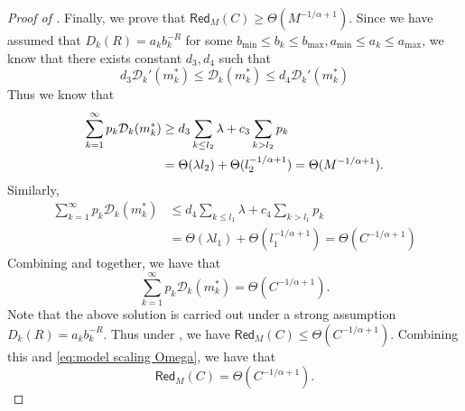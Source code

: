 \documentclass[11pt]{article}
\theoremstyle{plain}
\theoremstyle{definition}
\newtheorem{assumption}[theorem]{Assumption}
\newcommand{\ratedistortion}{\mathcal{D}}
\newcommand{\ferror}{\mathsf{Red}}
\newcommand{\testmodelerror}{\mathsf{Red}_M}
\newcommand{\jian}[1]{{\it \color{red}{Jian: #1}}}
\begin{document}
\begin{proof}[Proof of ]
Finally, we prove that $\testmodelerror(C)\ge \Theta(M^{-1/\alpha+1})$. 
Since we have assumed that $D_k(R)=a_kb_k^{-R}$ for some $b_{\min}\le b_k\le b_{\max},a_{\min}\le a_k\le a_{\max}$, we know that there exists constant $d_3,d_4$ such that 
\[d_3\ratedistortion_k'(m^*_k)\le\ratedistortion_k(m^*_k)\le d_4\ratedistortion_k'(m^*_k)\]
Thus we know that 
\begin{align}
\label{eq:1}
    \sum\limits_{k=1}^{\infty}p_k \ratedistortion_k(m_k^*) \notag
 & \ge d_3\sum\limits_{k\le l_2}\lambda + c_3\sum\limits_{k>l_2} p_k\notag \\
 & = \Theta(\lambda l_2) + \Theta(l_2^{-1/\alpha+1}) = \Theta(M^{-1/\alpha+1}).
\end{align}
Similarly, 
\begin{align}
\label{eq:2}
    \sum\limits_{k=1}^{\infty}p_k \ratedistortion_k(m_k^*)
 &\le d_4\sum\limits_{k\le l_1}\lambda + c_4\sum\limits_{k>l_1} p_k
 \\&= \Theta(\lambda l_1) + \Theta(l_1^{-1/\alpha+1}) = \Theta(C^{-1/\alpha+1})
\end{align}
Combining  and  together, we have that 
\[ 
\sum\limits_{k=1}^{\infty}p_k \ratedistortion_k(m_k^*)=\Theta(C^{-1/\alpha+1}).
\]
Note that the above solution is carried out under a strong assumption $D_k(R)=a_kb_k^{-R}.$
Thus under , we have $\testmodelerror(C)\le \Theta(C^{-1/\alpha+1})$. Combining this and \eqref{eq:model scaling Omega}, we have that 
\[
\testmodelerror(C)= \Theta(C^{-1/\alpha+1}).
\]
\end{proof}

\end{document}
